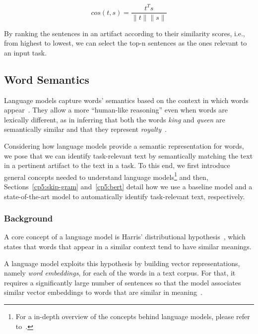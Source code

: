 \begin{equation}
    cos(t,s) = \frac{t^Ts}{\|t\| \|s\|}
    \label{eq:lex-sim}
\end{equation}
\smallskip

By ranking the sentences in an artifact according to their similarity scores, i.e., from highest to lowest,
we can  select the top-n sentences as the ones relevant to an input task.



\subsection{Word Semantics}


Language models capture words' semantics based on the context in which words appear~\cite{harris1954distributional}.
They allow a more ``human-like reasoning'' even when words are lexically different, as in 
inferring that both the words \textit{king} and \textit{queen} are semantically similar and that they represent \textit{royalty}~\cite{Mikolov2013}.


Considering how language models provide a semantic representation for words, we pose that we can identify task-relevant text by semantically matching the text in a pertinent artifact to the text in a task.
To this end, we first introduce general concepts needed to understand language models\footnote{
    For a in-depth overview of the concepts behind language models, please refer to~\cite{zhang2021deep-learning}.
} and then, 
Sections~\ref{cp5:skip-gram} and~\ref{cp5:bert}
detail how we use a baseline model and 
a state-of-the-art model to automatically identify task-relevant text, respectively.





\subsubsection{Background}


A core concept of a language model is Harris' distributional hypothesis~\cite{harris1954distributional}, which states that words that appear in a similar context tend to have similar meanings.


A language model exploits this hypothesis by building vector representations, namely \textit{word embeddings}, for each of the words in a text corpus.
For that, it requires a significantly large number of sentences so that
the model associates similar vector embeddings to words that are similar in meaning~\cite{Ye2016}. 


